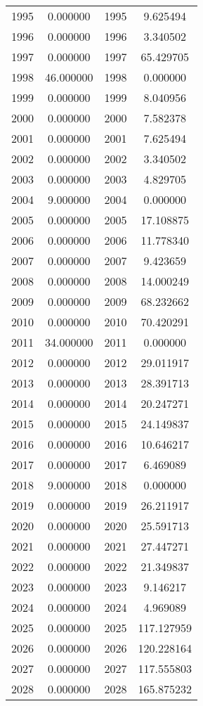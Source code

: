 \documentclass[12pt]{article}
\begin{document}
\begin{longtable}{@{}cccc@{}}
1995 & 0.000000 & 1995 & 9.625494 \\
1996 & 0.000000 & 1996 & 3.340502 \\
1997 & 0.000000 & 1997 & 65.429705 \\
1998 & 46.000000 & 1998 & 0.000000 \\
1999 & 0.000000 & 1999 & 8.040956 \\
2000 & 0.000000 & 2000 & 7.582378 \\
2001 & 0.000000 & 2001 & 7.625494 \\
2002 & 0.000000 & 2002 & 3.340502 \\
2003 & 0.000000 & 2003 & 4.829705 \\
2004 & 9.000000 & 2004 & 0.000000 \\
2005 & 0.000000 & 2005 & 17.108875 \\
2006 & 0.000000 & 2006 & 11.778340 \\
2007 & 0.000000 & 2007 & 9.423659 \\
2008 & 0.000000 & 2008 & 14.000249 \\
2009 & 0.000000 & 2009 & 68.232662 \\
2010 & 0.000000 & 2010 & 70.420291 \\
2011 & 34.000000 & 2011 & 0.000000 \\
2012 & 0.000000 & 2012 & 29.011917 \\
2013 & 0.000000 & 2013 & 28.391713 \\
2014 & 0.000000 & 2014 & 20.247271 \\
2015 & 0.000000 & 2015 & 24.149837 \\
2016 & 0.000000 & 2016 & 10.646217 \\
2017 & 0.000000 & 2017 & 6.469089 \\
2018 & 9.000000 & 2018 & 0.000000 \\
2019 & 0.000000 & 2019 & 26.211917 \\
2020 & 0.000000 & 2020 & 25.591713 \\
2021 & 0.000000 & 2021 & 27.447271 \\
2022 & 0.000000 & 2022 & 21.349837 \\
2023 & 0.000000 & 2023 & 9.146217 \\
2024 & 0.000000 & 2024 & 4.969089 \\
2025 & 0.000000 & 2025 & 117.127959 \\
2026 & 0.000000 & 2026 & 120.228164 \\
2027 & 0.000000 & 2027 & 117.555803 \\
2028 & 0.000000 & 2028 & 165.875232 \\

\end{longtable}
\end{document}
